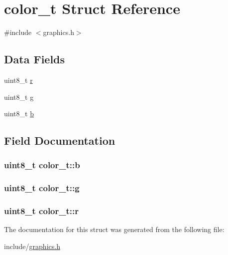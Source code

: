 \hypertarget{structcolor__t}{}\section{color\+\_\+t Struct Reference}
\label{structcolor__t}


{\ttfamily \#include $<$graphics.\+h$>$}

\subsection*{Data Fields}
\begin{DoxyCompactItemize}
\item 
uint8\+\_\+t \hyperlink{structcolor__t_a9138f903c9036862cfeab970b156b62d}{r}
\item 
uint8\+\_\+t \hyperlink{structcolor__t_a7d1a9e3552401fc5f8882f6e0c2c82aa}{g}
\item 
uint8\+\_\+t \hyperlink{structcolor__t_a83c6c6015c8a0bf9e120dd88caf13bcd}{b}
\end{DoxyCompactItemize}


\subsection{Field Documentation}
\subsubsection[{\texorpdfstring{b}{b}}]{\setlength{\rightskip}{0pt plus 5cm}uint8\+\_\+t color\+\_\+t\+::b}\hypertarget{structcolor__t_a83c6c6015c8a0bf9e120dd88caf13bcd}{}\label{structcolor__t_a83c6c6015c8a0bf9e120dd88caf13bcd}
\subsubsection[{\texorpdfstring{g}{g}}]{\setlength{\rightskip}{0pt plus 5cm}uint8\+\_\+t color\+\_\+t\+::g}\hypertarget{structcolor__t_a7d1a9e3552401fc5f8882f6e0c2c82aa}{}\label{structcolor__t_a7d1a9e3552401fc5f8882f6e0c2c82aa}
\subsubsection[{\texorpdfstring{r}{r}}]{\setlength{\rightskip}{0pt plus 5cm}uint8\+\_\+t color\+\_\+t\+::r}\hypertarget{structcolor__t_a9138f903c9036862cfeab970b156b62d}{}\label{structcolor__t_a9138f903c9036862cfeab970b156b62d}


The documentation for this struct was generated from the following file\+:\begin{DoxyCompactItemize}
\item 
include/\hyperlink{graphics_8h}{graphics.\+h}\end{DoxyCompactItemize}

